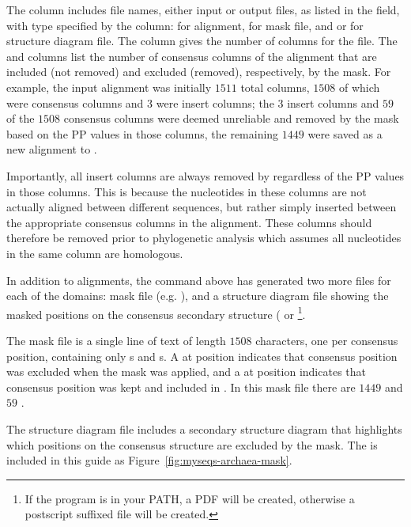The  column includes file names, either input or
output files, as listed in the  field, with type
specified by the  column:  for alignment,
 for mask file, and  or  for structure
diagram file. The  column gives the number of columns for the
file. The  and  columns list the number of consensus
columns of the alignment that are included (not removed) and excluded
(removed), respectively, by the mask. For example, the
 input alignment was initially $1511$ total
columns, $1508$ of which were consensus columns and $3$ were insert
columns; the $3$ insert columns and $59$ of the $1508$ consensus columns
were deemed unreliable and removed by the mask based on the PP values
in those columns, the remaining $1449$ were saved as a new alignment to
.

Importantly, all insert columns are always removed by 
regardless of the PP values in those columns. This is because the
nucleotides in these columns are not actually aligned between
different sequences, but rather simply inserted between the
appropriate consensus columns in the alignment. These columns should
therefore be removed prior to phylogenetic analysis which assumes
all nucleotides in the same column are homologous.

In addition to alignments, the command above has generated two more files
for each of the domains: 
mask file (e.g. ), and a structure diagram file
showing the masked positions on the consensus secondary structure
( or
 \footnote{If the program  is
    in your PATH, a PDF will be created, otherwise a postscript
     suffixed file will be created.}.

The mask file is a single line of text of length $1508$ characters, one per
consensus position, containing only s and s. 
A  at position  indicates that consensus position 
was excluded when the mask was applied, and a  at position
 indicates that consensus position  was kept and
included in . In this mask file there are
$1449$  and $59$ .

The structure diagram file includes a secondary structure diagram that
highlights which positions on the consensus structure are excluded by
the mask. The  is included in this guide
as Figure~\ref{fig:myseqs-archaea-mask}.

